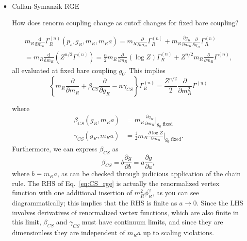 \begin{itemize}
where

\begin{align}
    \beta_{WK}(g_0, m_R a) &= - a \frac{\partial g_0}{\partial a}\bigg|_{g_R \, \text{fixed}}\\
    &= -m_R a \left.\frac{\partial g_0}{\partial m_Ra}\right|_{g_R\text{ fixed}}
    =-\left.\frac{\partial g_0}{\partial \ln(m_Ra)}\right|_{g_R\text{ fixed}}
    \\
    \gamma_{WK}(g_0, m_R a) &= \frac{1}{2} a \frac{\partial \log Z}{\partial a}\bigg|_{g_R \, \text{fixed}}
\end{align}

The dependence on \(m_{R} a\) comes only from scaling violations. \(\beta_{WK}(g_0)\) controls how $g_0$ changes with the cutoff.


  \item Callan-Symanzik RGE


How does renorm coupling change as cutoff changes for fixed bare coupling?

\begin{align}
    m_R \frac{\text{d}}{\text{d} m_R}\Gamma^{(n)}_R(p_i, g_R, m_R, m_R a) =  m_R \frac{\partial}{\partial m_R}\Gamma^{(n)}_R + m_R \frac{\partial g_R}{\partial m_R} \frac{\partial}{\partial g_R}\Gamma^{(n)}_R \\
    = m_R \frac{\text{d}}{\text{d} m_R} (Z^{n/2}\Gamma^{(n)}) = \frac{n}{2}m_R \frac{\partial}{\partial m_R}(\log Z)\Gamma^{(n)}_R + Z^{n/2}m_R \frac{\partial}{\partial m_R}\Gamma^{(n)},
\end{align}
all evaluated at fixed bare coupling $g_0$. This implies
\begin{equation}
\label{eq:CS_rge}
    \left\{ m_R \frac{\partial}{\partial m_R} + \beta_{CS}\frac{\partial}{\partial g_R} - n \gamma_{CS}\right\} \Gamma_R^{(n)} = \frac{Z^{n/2}}{2}\frac{\partial}{\partial m_R^2}\Gamma^{(n)}
\end{equation}

where
\begin{align}
    \beta_{CS}(g_R, m_R a) &= m_R \frac{\partial g_R}{\partial m_R}\bigg|_{g_0\text{ fixed}} \\
    \gamma_{CS}(g_R, m_R a) &= \frac{1}{2}m_R \frac{\partial \log Z}{\partial m_R}\bigg|_{g_0\text{ fixed}}.
\end{align}
Furthermore, we can express $\beta_{CS}$ as
\begin{equation}
    \beta_{CS} = b \frac{\partial g}{\partial b} = a \frac{\partial g}{\partial a},
\end{equation}
where $b \equiv m_R a$, as can be checked through judicious application of the chain rule.
%
The RHS of Eq.~\eqref{eq:CS_rge} is actually the renormalized vertex function with one additional insertion of $m_R^2 \phi_R^2$, as you can see diagrammatically; this implies that the RHS is finite as $a \rightarrow 0$.
%
Since the LHS involves derivatives of renormalized vertex functions, which are also finite in this limit, $\beta_{CS}$ and $\gamma_{CS}$ must have continuum limits, and since they are dimensionless they are independent of $m_R a$ up to scaling violations.
%


\end{itemize}
